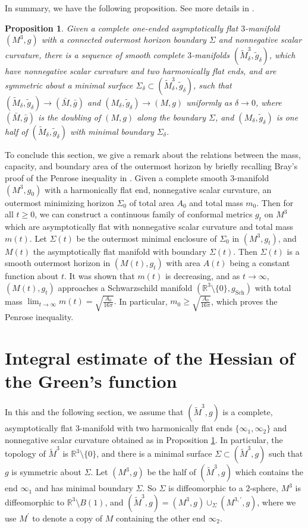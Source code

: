\documentclass[letter]{amsart}
\newtheorem{prop}[thm]{Proposition}
\theoremstyle{definition}
\theoremstyle{remark}
\begin{document}
In summary, we have the following proposition. See more details in \cite{Bray97}.
\begin{prop}\label{doubling-approx}
	Given a complete one-ended asymptotically flat $3$-manifold $(M^3, g)$ with a connected outermost horizon boundary $\Sigma$ and nonnegative scalar curvature, there is a sequence of smooth complete $3$-manifolds $(\tilde{M}^3_\delta , \tilde{g}_\delta )$, which have nonnegative scalar curvature and two harmonically flat ends, and are symmetric about a minimal surface $\Sigma_{\delta } \subset (\tilde{M}^{3}_\delta , \tilde{g}_\delta )$, such that $(\tilde{M}_\delta ,\tilde{g}_\delta) \to (\bar{M}, \bar{g})$ and $(M_\delta , \tilde{g}_\delta ) \to (M, g)$ uniformly as $\delta \to 0$, where $(\bar{M}, \bar{g})$ is the doubling of $(M, g)$ along the boundary $\Sigma$, and $(M_\delta , \tilde{g}_\delta )$ is one half of $(\tilde{M}_\delta , \tilde{g}_\delta )$ with minimal boundary $\Sigma_\delta $.
\end{prop}

To conclude this section, we give a remark about the relations between the mass, capacity, and boundary area of the outermost horizon by briefly recalling Bray's proof of the Penrose inequality in \cite{Bray'01}. Given a complete smooth $3$-manifold $(M^3, g_0)$ with a harmonically flat end, nonnegative scalar curvature, an outermost minimizing horizon $\Sigma_0$ of total area $A_0$ and total mass $m_0$. Then for all $t \geq 0$, we can construct a continuous family of conformal metrics $g_t$ on $M^3$ which are asymptotically flat with nonnegative scalar curvature and total mass $m(t)$. Let $\Sigma(t)$ be the outermost minimal enclosure of $\Sigma_0$ in $(M^3, g_t)$, and $M(t)$ the asymptotically flat manifold with boundary $\Sigma (t)$. Then $\Sigma(t)$ is a smooth outermost horizon in $(M(t), g_t)$ with area $A(t)$ being a constant function about $t$. It was shown that $m(t)$ is decreasing, and as $t\to \infty$, $(M(t), g_t)$ approaches a Schwarzschild manifold $(\mathbb{R}^3\setminus \{0\} , g_{\mathrm{Sch}})$ with total mass $\lim_{t\to \infty}m(t) = \sqrt{\frac{A_0}{16 \pi }} .$ In particular, $m_0 \geq \sqrt{\frac{A_0}{16 \pi }} $, which proves the Penrose inequality.

\section{Integral estimate of the Hessian of the Green's function}
In this and the following section, we assume that $(\tilde{M}^{3}, g)$ is a complete, asymptotically flat $3$-manifold with two harmonically flat ends $\{\infty_1, \infty_2\} $ and nonnegative scalar curvature obtained as in Proposition \ref{doubling-approx}. In particular, the topology of $\tilde{M}^3$ is $\mathbb{R}^3 \setminus \{0\} $, and there is a minimal surface $\Sigma \subset (\tilde{M}^3, g)$ such that $g$ is symmetric about $\Sigma$. Let $(M^3, g)$ be the half of $(\tilde{M}^3, g)$ which contains the end $\infty_1$ and has minimal boundary $\Sigma$. So $\Sigma$ is diffeomorphic to a $2$-sphere, $M^3$ is diffeomorphic to $\mathbb{R}^3 \setminus B(1)$, and $(\tilde{M}^3, g) = (M^3, g) \cup _{\Sigma} (M^{3,\prime}, g)$, where we use $M^{\prime}$ to denote a copy of $M$ containing the other end $\infty_2$.
\end{document}
